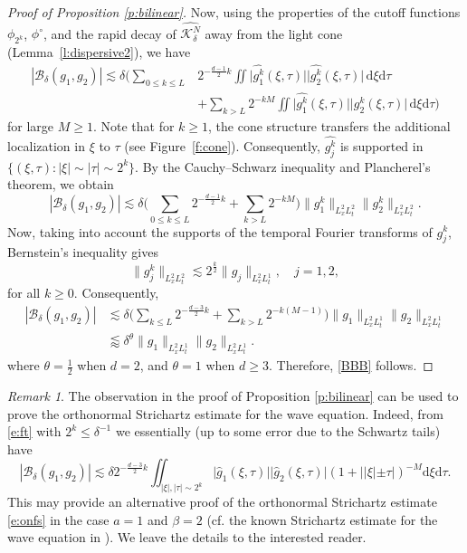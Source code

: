 \documentclass[a4paper]{amsart}
\numberwithin{figure}{section}
\numberwithin{equation}{section}%
\theoremstyle{plain}%
\theoremstyle{definition}
\theoremstyle{remark}%
\newtheorem*{remark}{Remark}
\def\d{\mathrm{d}}
\begin{document}
\begin{proof}[Proof of Proposition \ref{p:bilinear}]
Now, using the properties of the cutoff functions $\phi_{2^k}$, $\phi^\circ$, and the rapid decay of $\widehat{\mathcal K_\delta^N}$ away from the light cone (Lemma~\ref{l:dispersive2}), 
we have 
\begin{align*}
|\mathcal B_\delta(g_1,g_2)|
\lesssim \delta\Big(  
\sum_{0\leq k\le L} &2^{-\frac{d-1}2k}\iint  \Big| \widehat{g_1^k}(\xi,\tau) \Big|  \Big|  \widehat{g_2^k}(\xi,\tau) \Big| \,\d\xi\d\tau  \\ &+    \sum_{k>L}  2^{-kM}   \iint \Big| \widehat{g_1^k}(\xi,\tau) \Big|  \Big|  \widehat{g_2^k}(\xi,\tau) \Big| \,\d\xi\d\tau\Big)
\end{align*}
for large $M\ge1$. 
Note that for $k\geq 1$, the cone structure transfers the additional localization in $\xi$ to $\tau$ (see Figure~\ref{f:cone}). Consequently, $\widehat{g_j^k}$ is supported in $\{(\xi,\tau): |\xi|\sim |\tau| \sim 2^{k} \}$.
By the Cauchy--Schwarz inequality and  Plancherel's theorem, we obtain 
\[ 
|\mathcal B_\delta(g_1,g_2)|
\lesssim \delta\Big(  \sum_{0 \le k\le L} 2^{-\frac{d-1}2k} +\sum_{k>L}   2^{-kM} \Big)\|g_1^k\|_{L^2_xL^2_t}\| {g_2^k}\|_{L^2_xL^2_t}.
\] 
Now, taking into account the supports of the temporal Fourier transforms of $g_j^k$, Bernstein's inequality gives
\[
\|g_j^k \|_{L^2_xL^2_t}
\lesssim 2^{\frac k2 }\|g_j\|_{L^2_xL_t^1},  \quad j=1,2,   \]
for all $k\ge0$. 
Consequently,
\begin{align*}
|\mathcal B_\delta(g_1,g_2)|
&\lesssim \delta   \Big(\sum_{k\le L}2^{-\frac{d-3}2k}+    \sum_{k> L}   2^{-k(M-1)}\Big) \|g_1\|_{L^2_xL_t^1}\| g_2\|_{L^2_xL_t^1} \\
&\lessapprox \delta^{\theta}\|g_1\|_{L^2_xL_t^1}\| g_2\|_{L^2_xL_t^1}.
\end{align*}
where $\theta=\frac12$ when $d=2$, and $\theta=1$ when $d\ge3$.
Therefore, \eqref{BBB} follows. 
\end{proof}




\begin{remark}  The observation in the proof of Proposition \ref{p:bilinear} can be used to prove the orthonormal Strichartz estimate for the wave equation. Indeed, from \eqref{e:ft} with $2^k \le \delta^{-1}$ we essentially (up to some 
error due to the Schwartz tails) have
\[
|\mathcal B_\delta(g_1,g_2)|
\lesssim
\delta 2^{-\frac{d-3}2k}
\iint_{|\xi|,|\tau|\sim 2^k} \Big|  \widehat{g}_1(\xi,\tau)\Big| \Big|{\widehat{g}}_2(\xi,\tau)\Big|
(1+||\xi|\pm \tau|)^{-M}
\d \xi\d \tau.
\]
This may provide an alternative proof of the orthonormal Strichartz estimate \eqref{e:onfs} in the case $a = 1$ and $\beta = 2$
 (cf. the known Strichartz estimate for the wave equation in \cite[Proposition 3.1]{BCL18}). We leave the details to the interested reader.
\end{remark}
\end{document}
